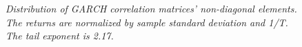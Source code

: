 \documentclass{article}
\begin{document}
\begin{figure}[htb!]
  \centering
  \caption{\small \it Distribution of GARCH correlation matrices'
    non-diagonal elements. The returns are normalized by sample
    standard deviation and 1/T. The tail exponent is 2.17.}
  \label{fig:garch_Cij_sample}
\end{figure}
\end{document}
